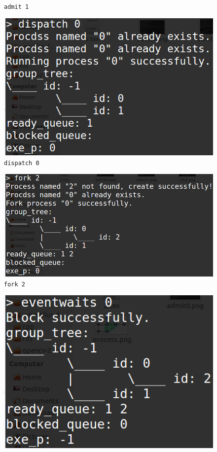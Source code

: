 \documentclass[11pt]{article}
\begin{document}
\begin{center}
\begin{figure}[htbp]
\caption{\texttt{admit 1}}
\label{fig: admit1}
\end{figure}
\begin{figure}[htbp]
\includegraphics[width=\textwidth]{dispatch0.png}
\caption{\texttt{dispatch 0}}
\label{fig: dispatch0}
\end{figure}
\begin{figure}[htbp]
\includegraphics[width=\textwidth]{fork2.png}
\caption{\texttt{fork 2}}
\label{fig: fork2}
\end{figure}
\begin{figure}[htbp]
\includegraphics[width=\textwidth]{eventwaits0.png}

\end{figure}
\end{center}
\end{document}
